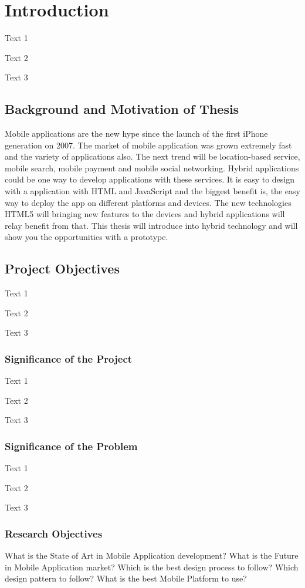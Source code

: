 \chapter{Introduction}
\label{chap:intro}
Text 1

Text 2

Text 3

\section{Background and Motivation of Thesis} \label{sec:i1}

Mobile applications are the new hype since the launch of the first iPhone generation on 2007. The market of mobile application was grown extremely fast and the variety of applications also. The next trend will be location-based service, mobile search, mobile payment and mobile social networking. Hybrid applications could be one way to develop applications with these services. It is easy to design with a application with HTML and JavaScript and the biggest benefit is, the easy way to deploy the app on different platforms
and devices. The new technologies HTML5 will bringing new features to the devices and hybrid applications will relay benefit from that. This thesis will introduce into hybrid
technology and will show you the opportunities with a prototype.

\section{Project Objectives}\label{sec:i2}
Text 1

Text 2

Text 3

\subsection{Significance of the Project}\label{sec:i2.1}
Text 1

Text 2

Text 3

\subsection{Significance of the Problem}\label{sec:i2.2}
Text 1

Text 2

Text 3

\subsection{Research Objectives}\label{sec:i2.3}
What is the State of Art in Mobile Application development?
What is the Future in Mobile Application market?
Which is the best design process to follow?
Which design pattern to follow?
What is the best Mobile Platform to use? 

